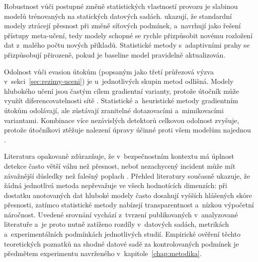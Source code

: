 Robustnost vůči postupné změně statistických vlastností provozu je slabinou modelů trénovaných na statických datových sadách. \textcite{Qing2025} ukazují, že standardní modely ztrácejí přesnost při změně síťových podmínek, a~navrhují jako řešení přístupy meta-učení, tedy modely schopné se rychle přizpůsobit novému rozložení dat z~malého počtu nových příkladů. Statistické metody s~adaptivními prahy se přizpůsobují přirozeně, pokud je baseline model pravidelně aktualizován.

Odolnost vůči evasion útokům (popsaným jako třetí průřezová výzva v~sekci~\ref{sec:rezimy-uceni}) je u~jednotlivých skupin metod odlišná. Modely hlubokého učení jsou častým cílem gradientní varianty, protože útočník může využít diferencovatelnosti sítě \parencite{He2023}. Statistické a~heuristické metody gradientním útokům odolávají, ale zůstávají zranitelné dotazovacími a~mimikovacími variantami. Kombinace více nezávislých detektorů celkovou odolnost zvyšuje, protože útočníkovi ztěžuje nalezení úpravy účinné proti všem modelům najednou \parencite{He2023}.

Literatura opakovaně zdůrazňuje, že v~bezpečnostním kontextu má úplnost detekce často větší váhu než přesnost, neboť nezachycený incident může mít závažnější důsledky než falešný poplach \parencite{OzkanOkay2021}. Přehled literatury současně ukazuje, že žádná jednotlivá metoda nepřevažuje ve všech hodnotících dimenzích: při dostatku anotovaných dat hluboké modely často dosahují vyšších hlášených skóre přesnosti, zatímco statistické metody nabízejí transparentnost a~nízkou výpočetní náročnost. Uvedené srovnání vychází z~tvrzení publikovaných v~analyzované literatuře a~je proto nutně zatíženo rozdíly v~datových sadách, metrikách a~experimentálních podmínkách jednotlivých studií. Empirické ověření těchto teoretických poznatků na shodné datové sadě za kontrolovaných podmínek je předmětem experimentu navrženého v~kapitole~\ref{chap:metodika}.

